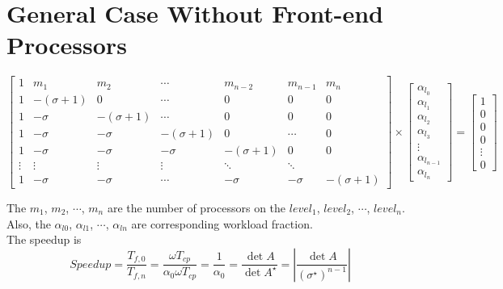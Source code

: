 \section{General Case Without Front-end Processors}
\begin{equation}
{
\left[ \begin{array}{ccccccc}
1 & m_{1} & m_{2} & \cdots & m_{n-2} & m_{n-1} & m_{n}\\
1 & -(\sigma + 1) & 0 & \cdots& 0 & 0 & 0\\
1 & -\sigma & -(\sigma + 1) & \cdots & 0 & 0 & 0 \\
1 & -\sigma & -\sigma & -(\sigma + 1) & 0 & \cdots & 0 \\
1 & -\sigma & -\sigma & -\sigma & -(\sigma + 1) & 0 & 0 \\
\vdots & \vdots & \vdots  &   \vdots & \ddots & \ddots\\
1 & -\sigma & -\sigma & \cdots & -\sigma & -\sigma & -(\sigma + 1)
\end{array} 
\right ]} \times \left[ \begin{array}{c}
\alpha_{l_{0}} \\
\alpha_{l_{1}} \\
\alpha_{l_{2}} \\
\alpha_{l_{3}} \\
\vdots \\
\alpha_{l_{n-1}}\\
\alpha_{l_{n}}
\end{array} 
\right ] = \left[ \begin{array}{c}
1 \\
0 \\
0 \\
0 \\
\vdots \\
0
\end{array} 
\right ]
\end{equation}

The $m_{1}$, $m_{2}$, $\cdots$, $m_{n}$ are the number of processors on the $level_{1}$, $level_{2}$, $\cdots$, $level_{n}$.   Also, the $\alpha_{l0}$, $\alpha_{l1}$,  $\cdots$, $\alpha_{ln}$ are corresponding workload fraction. \\

The speedup is  
$$Speedup = \frac{T_{f, 0}}{T_{f, n}}= \frac{\omega T_{cp}}{\alpha_{0}\omega T_{cp}} = \frac{1}{\alpha_{0}} = \frac{\det A}{\det A^{\star}} = \left |\frac{\det A}{(\sigma^{\star})^{n-1}}\right|$$